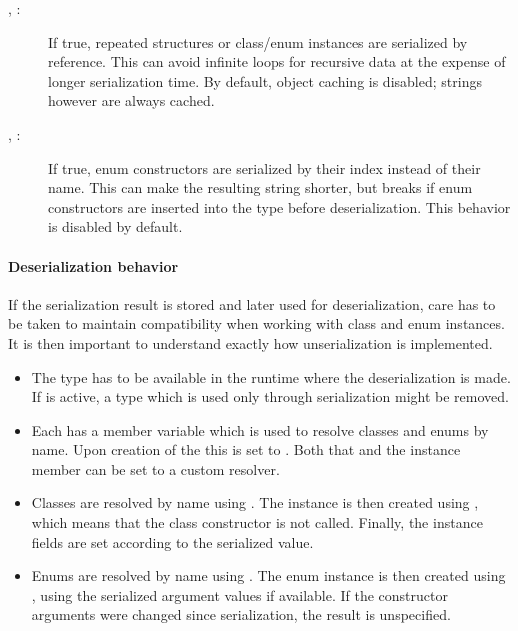\begin{description}
	\item[, :] If true, repeated structures or class\slash enum instances are serialized by reference. This can avoid infinite loops for recursive data at the expense of longer serialization time. By default, object caching is disabled; strings however are always cached.
	\item[, :] If true, enum constructors are serialized by their index instead of their name. This can make the resulting string shorter, but breaks if enum constructors are inserted into the type before deserialization. This behavior is disabled by default.
\end{description}

\paragraph{Deserialization behavior}

If the serialization result is stored and later used for deserialization, care has to be taken to maintain compatibility when working with class and enum instances. It is then important to understand exactly how unserialization is implemented.

\begin{itemize}
	\item The type has to be available in the runtime where the deserialization is made. If  is active, a type which is used only through serialization might be removed.
	\item Each  has a member variable  which is used to resolve classes and enums by name. Upon creation of the  this is set to . Both that and the instance member can be set to a custom resolver.
	\item Classes are resolved by name using . The instance is then created using , which means that the class constructor is not called. Finally, the instance fields are set according to the serialized value.
	\item Enums are resolved by name using . The enum instance is then created using , using the serialized argument values if available. If the constructor arguments were changed since serialization, the result is unspecified.
\end{itemize}

